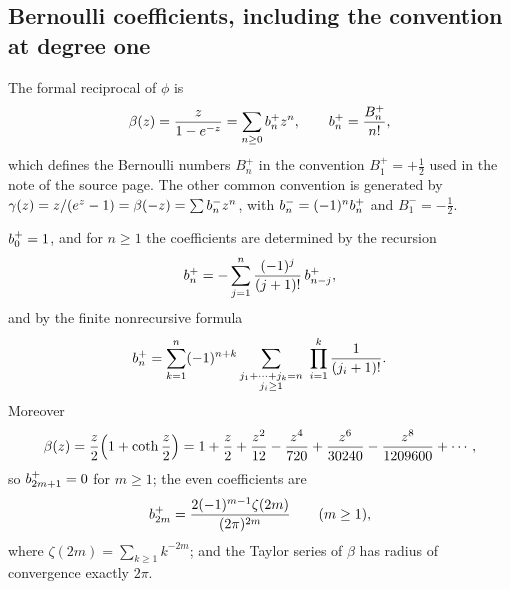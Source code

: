 \subsection{Bernoulli coefficients, including the convention at degree one}
The formal reciprocal of $\phi$ is
\begin{equation}\label{eq:betadef}
 \beta(z)=\frac{z}{1-e^{-z}}=\sum_{n\geq0}b^{+}_{n}z^n,\qquad
 b^{+}_{n}=\frac{B_n^+}{n!},
\end{equation}
which defines the Bernoulli numbers $B_n^+$ in the convention
$B_1^+=+\tfrac12$ used in the note of the source page. The other common
convention is generated by $\gamma(z)=z/(e^z-1)=\beta(-z)=\sum b^{-}_{n}z^n$,
with $b^{-}_{n}=(-1)^nb^{+}_{n}$ and $B_1^-=-\tfrac12$.

\begin{proposition}\label{prop:bernoulli}
$b^{+}_{0}=1$, and for $n\geq1$ the coefficients are determined by the
recursion
\begin{equation}\label{eq:bernrec}
 b^{+}_{n}=-\sum_{j=1}^{n}\frac{(-1)^j}{(j+1)!}\,b^{+}_{n-j},
\end{equation}
and by the finite nonrecursive formula
\begin{equation}\label{eq:bernfinite}
 \bplus{n}=\sum_{k=1}^{n}(-1)^{n+k}
 \sum_{\substack{j_1+\cdots+j_k=n\\j_i\geq1}}\ \prod_{i=1}^{k}\frac1{(j_i+1)!}.
\end{equation}
Moreover
\begin{equation}\label{eq:coth}
 \beta(z)=\frac z2\Bigl(1+\coth\frac z2\Bigr)
 =1+\frac z2+\frac{z^2}{12}-\frac{z^4}{720}+\frac{z^6}{30240}
 -\frac{z^8}{1209600}+\cdots,
\end{equation}
so $b^{+}_{2m+1}=0$ for $m\geq1$; the even coefficients are
\begin{equation}\label{eq:bernzeta}
 b^{+}_{2m}=\frac{2(-1)^{m-1}\zeta(2m)}{(2\pi)^{2m}}\qquad(m\geq1),
\end{equation}
where $\zeta(2m)=\sum_{k\geq1}k^{-2m}$; and the Taylor series of $\beta$ has
radius of convergence exactly $2\pi$.
\end{proposition}
